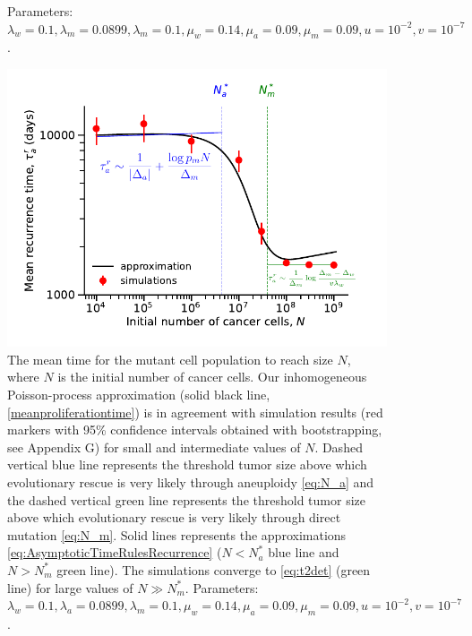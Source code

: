 \documentclass[12pt]{extarticle}
\begin{document}
\begin{appendices}
\begin{figure}
{Parameters: $\lambda_w=0.1,\lambda_m=0.0899,\lambda_m=0.1,\mu_w=0.14,\mu_a=0.09,\mu_m=0.09, u=10^{-2}, v=10^{-7}$.}
\label{EvolutionaryRescueTimeComplete}
\end{figure}
\begin{figure}
\vspace*{1\baselineskip}
\includegraphics[width=1\textwidth]{Figures/ProliferationTimeLarge.pdf}
\caption{The mean time for the mutant cell population to reach size $N$, where $N$ is the initial number of cancer cells.
Our inhomogeneous Poisson-process approximation (solid black line, \cref{meanproliferationtime}) is in agreement with simulation results (red markers with 95\% confidence intervals obtained with bootstrapping, see Appendix G) for small and intermediate values of $N$. Dashed vertical blue line represents the threshold tumor size above which evolutionary rescue is very likely through aneuploidy \cref{eq:N_a} and the dashed vertical green line represents the threshold tumor size above which evolutionary rescue is very likely through direct mutation \cref{eq:N_m}. Solid lines represents the approximations \cref{eq:AsymptoticTimeRulesRecurrence} ($N<N_a^*$ blue line and $N>N_m^*$ green line). The simulations converge to \cref{eq:t2det} (green line) for large values of $N\gg N_m^*$.  Parameters: $\lambda_w=0.1,\lambda_a=0.0899,\lambda_m=0.1,\mu_w=0.14,\mu_a=0.09,\mu_m=0.09, u=10^{-2}, v=10^{-7}$.}
\label{ProliferationTimeLarge}
\end{figure}
\begin{figure}
\vspace*{1\baselineskip}

\end{figure}
\end{appendices}
\end{document}
